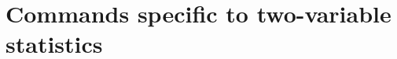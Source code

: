 \documentclass[11pt,a4paper]{ltxdoc}
\begin{document}
%
%
%
%
%
%
%
%
%

\pagebreak

\section{Commands specific to two-variable statistics}
\end{document}

